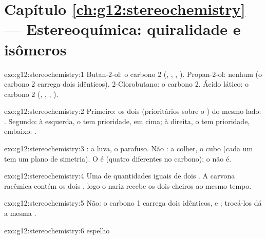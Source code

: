 \section*{Capítulo \ref{ch:g12:stereochemistry} --- Estereoquímica: quiralidade e isômeros}

\begin{solution}{exo:g12:stereochemistry:1}
Butan-2-ol: o carbono 2 (, , , ).
Propan-2-ol: nenhum (o carbono 2 carrega dois  idênticos).
2-Clorobutano: o carbono 2. Ácido lático: o carbono 2 (, ,
, ).
\end{solution}

\begin{solution}{exo:g12:stereochemistry:2}
Primeiro: os dois  (prioritários sobre o ) do mesmo lado:
. Segundo: à esquerda, o  tem prioridade, em cima; à direita, o
 tem prioridade, embaixo: .
\end{solution}

\begin{solution}{exo:g12:stereochemistry:3}
: a luva, o parafuso. Não : a colher, o cubo (cada um tem
um plano de simetria). O  é  (quatro  diferentes
no carbono); o  não é.
\end{solution}

\begin{solution}{exo:g12:stereochemistry:4}
Uma  de quantidades iguais de dois . A carvona
racêmica contém os dois , logo o nariz recebe os dois
cheiros ao mesmo tempo.
\end{solution}

\begin{solution}{exo:g12:stereochemistry:5}
Não: o carbono 1 carrega dois  idênticos,  e ;
trocá-los dá a mesma .
\end{solution}

\begin{solution}{exo:g12:stereochemistry:6}
 \quad espelho
\quad {}
\end{solution}

